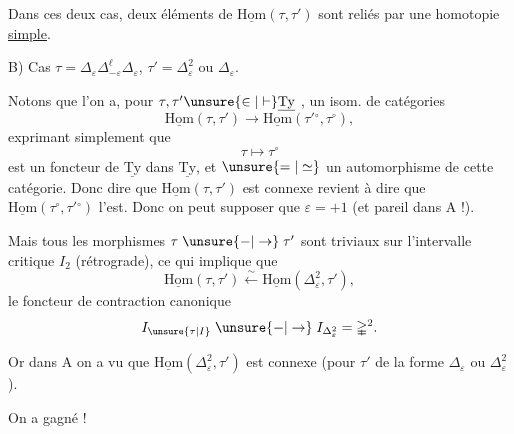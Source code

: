 Dans ces deux cas, deux éléments de $\underline{\mathrm{Hom}}(\tau,\tau')$ sont reliés par une homotopie \uline{simple}.


B) Cas $\tau=\Delta_\varepsilon\Delta_{-\varepsilon}^{\ell}\Delta_\varepsilon$, $\tau'=\mathbb{\Delta}_\varepsilon^2$ ou $\mathbb{\Delta}_\varepsilon$.

Notons que l'on a, pour $\tau,\tau'\unsure{\in|\vdash}\underline{\mathrm{Ty}}$ , un isom. de catégories
\[
\underline{\mathrm{Hom}}(\tau,\tau')\longrightarrow\underline{\mathrm{Hom}}(\tau'{}^\circ,\tau^\circ),
\]
exprimant simplement que
\[
\tau\longmapsto\tau^\circ
\]
est un foncteur  de $\underline{\mathrm{Ty}}$ dans $\underline{\mathrm{Ty}}$, et $\unsure{=|\simeq}$ un automorphisme de cette catégorie. Donc dire que $\underline{\mathrm{Hom}}(\tau,\tau')$ est connexe revient à dire que $\underline{\mathrm{Hom}}(\tau^\circ,\tau'{}^\circ)$ l'est. Donc on peut supposer  que $\varepsilon=+1$ (et pareil dans A !).

\diagram{\begin{tikzcd}[ampersand replacement=\&,column sep=.65em]
\tau:\&{}\arrow[r]\&{}\&{}\arrow[l]\&{}\arrow[l]\&\cdots\&{}\arrow[l]\&{}\arrow[r]\&{}
\arrow[from=1-3,to=1-7,phantom,"{\underbrace{\hspace{3.1cm}}_{\ell}}"']
\end{tikzcd}}

Mais tous les  morphismes $\tau\mathrel{\unsure{-|\to}}\tau'$ sont triviaux sur l'intervalle critique $I_2$ (rétrograde), ce qui implique que
\[
\underline{\mathrm{Hom}}(\tau,\tau')\xleftarrow{\sim}\underline{\mathrm{Hom}}(\Delta_\varepsilon^2,\tau'),
\]
  le foncteur de contraction canonique
\[
I_{\unsure{\tau|I}}\mathrel{\unsure{-|\to}}I_{\Delta_\varepsilon^2}=\mathbb{\Delta}^{2}.
\]

Or dans A on a vu que $\underline{\mathrm{Hom}}(\Delta_\varepsilon^2,\tau')$ est connexe (pour $\tau'$ de la forme $\Delta_\varepsilon$ ou $\Delta_\varepsilon^2$).

On a gagné !


